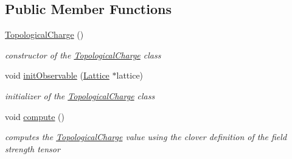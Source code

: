 \subsection*{Public Member Functions}
\begin{DoxyCompactItemize}
\item 
\hyperlink{classTopologicalCharge_acde41752635904656dd9a88ab6514d5d}{Topological\+Charge} ()\hypertarget{classTopologicalCharge_acde41752635904656dd9a88ab6514d5d}{}\label{classTopologicalCharge_acde41752635904656dd9a88ab6514d5d}

\begin{DoxyCompactList}\small\item\em constructor of the \hyperlink{classTopologicalCharge}{Topological\+Charge} class \end{DoxyCompactList}\item 
void \hyperlink{classTopologicalCharge_a3738265d7e456997ba0ff57bcba55188}{init\+Observable} (\hyperlink{classLattice}{Lattice} $\ast$lattice)\hypertarget{classTopologicalCharge_a3738265d7e456997ba0ff57bcba55188}{}\label{classTopologicalCharge_a3738265d7e456997ba0ff57bcba55188}

\begin{DoxyCompactList}\small\item\em initializer of the \hyperlink{classTopologicalCharge}{Topological\+Charge} class \end{DoxyCompactList}\item 
void \hyperlink{classTopologicalCharge_a67b19b74c8c4f981d37490623ca774f2}{compute} ()\hypertarget{classTopologicalCharge_a67b19b74c8c4f981d37490623ca774f2}{}\label{classTopologicalCharge_a67b19b74c8c4f981d37490623ca774f2}

\begin{DoxyCompactList}\small\item\em computes the \hyperlink{classTopologicalCharge}{Topological\+Charge} value using the clover definition of the field strength tensor \end{DoxyCompactList}\end{DoxyCompactItemize}
